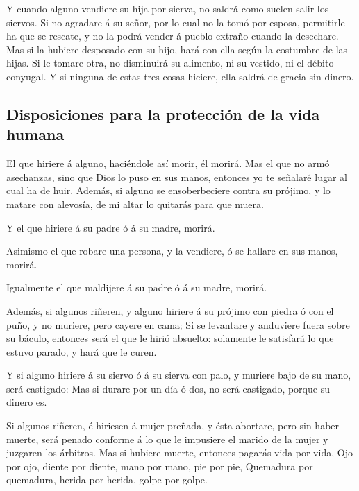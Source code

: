  Y cuando alguno vendiere su hija por sierva, no saldrá
como suelen salir los siervos.  Si no agradare á su señor,
por lo cual no la tomó por esposa, permitirle ha que se rescate, y no la
podrá vender á pueblo extraño cuando la desechare.  Mas si
la hubiere desposado con su hijo, hará con ella según la costumbre de
las hijas.  Si le tomare otra, no disminuirá su alimento,
ni su vestido, ni el débito conyugal.  Y si ninguna de
estas tres cosas hiciere, ella saldrá de gracia sin dinero.

\hypertarget{disposiciones-para-la-protecciuxf3n-de-la-vida-humana}{%
\subsection{Disposiciones para la protección de la vida
humana}\label{disposiciones-para-la-protecciuxf3n-de-la-vida-humana}}

 El que hiriere á alguno, haciéndole así morir, él
morirá.  Mas el que no armó asechanzas, sino que Dios lo
puso en sus manos, entonces yo te señalaré lugar al cual ha de huir.
 Además, si alguno se ensoberbeciere contra su prójimo, y
lo matare con alevosía, de mi altar lo quitarás para que muera.

 Y el que hiriere á su padre ó á su madre, morirá.

 Asimismo el que robare una persona, y la vendiere, ó se
hallare en sus manos, morirá.

 Igualmente el que maldijere á su padre ó á su madre,
morirá.

 Además, si algunos riñeren, y alguno hiriere á su
prójimo con piedra ó con el puño, y no muriere, pero cayere en cama;
 Si se levantare y anduviere fuera sobre su báculo,
entonces será el que le hirió absuelto: solamente le satisfará lo que
estuvo parado, y hará que le curen.

 Y si alguno hiriere á su siervo ó á su sierva con palo,
y muriere bajo de su mano, será castigado:  Mas si durare
por un día ó dos, no será castigado, porque su dinero es.

 Si algunos riñeren, é hiriesen á mujer preñada, y ésta
abortare, pero sin haber muerte, será penado conforme á lo que le
impusiere el marido de la mujer y juzgaren los árbitros. 
Mas si hubiere muerte, entonces pagarás vida por vida, 
Ojo por ojo, diente por diente, mano por mano, pie por pie,
 Quemadura por quemadura, herida por herida, golpe por
golpe.

